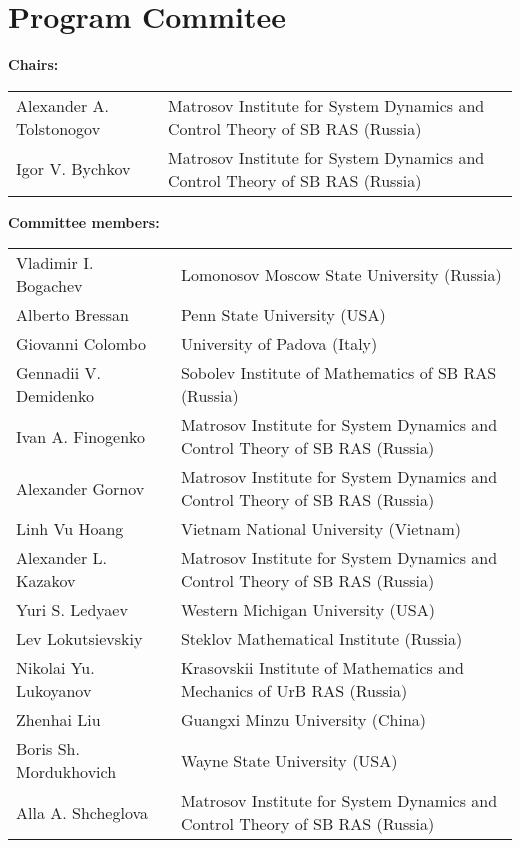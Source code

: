 \documentclass[12pt,final]{llncs}
\begin{document}
%
\vspace{-1em}
\section*{Program Commitee}
 \begin{english}

\textbf{Chairs:   }

\begin{tabular}{@{}p{6cm}@{}p{10cm}@{}}
  Alexander A. Tolstonogov &   Matrosov
Institute for System Dynamics and Control Theory of SB RAS (Russia)\\
Igor V. Bychkov &   Matrosov
Institute for System Dynamics and Control Theory of SB RAS (Russia)
\end{tabular}

\noindent\textbf{Committee members:}

\begin{tabular}{@{}p{5.5cm}@{}p{0.5cm}@{}p{10cm}@{}}
Vladimir I. Bogachev & & Lomonosov Moscow State University  (Russia)\\[0.5em]
Alberto Bressan && Penn State University (USA) \\[0.5em]
Giovanni Colombo && University of Padova (Italy)\\[0.5em]
Gennadii V. Demidenko &&  Sobolev Institute of Mathematics of SB RAS (Russia)\\[0.5em]
Ivan A. Finogenko &&  Matrosov  Institute for System Dynamics and Control Theory of SB RAS (Russia)  \\[0.5em]
Alexander Gornov && Matrosov  Institute for System Dynamics and Control Theory of SB RAS (Russia) \\[0.5em]
Linh Vu Hoang && Vietnam National University (Vietnam)\\[0.5em]
Alexander L. Kazakov &&  Matrosov  Institute for System Dynamics and Control Theory of SB RAS (Russia) \\[0.5em]
Yuri S. Ledyaev && Western Michigan University  (USA)	\\[0.5em]
Lev Lokutsievskiy && Steklov Mathematical Institute (Russia)\\[0.5em]
Nikolai Yu. Lukoyanov &&  Krasovskii Institute of Mathematics and Mechanics of UrB RAS (Russia)\\[0.5em]
Zhenhai Liu && Guangxi Minzu University (China)\\[0.5em]
Boris Sh. Mordukhovich &&  Wayne State University  (USA)\\[0.5em]
Alla A. Shcheglova &&  Matrosov  Institute for System Dynamics and Control Theory of SB RAS (Russia)\\[0.5em]
\end{tabular}
\end{english}
\end{document}
